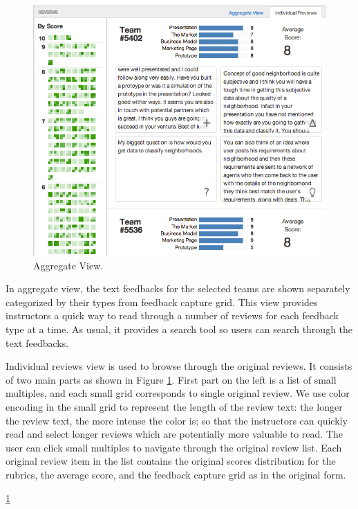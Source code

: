 \documentclass{sigchi}
\begin{document}
\begin{figure}[h]
\centering
\includegraphics[width=\columnwidth]{images/ind-review-view}
\caption{Aggregate View.}
\label{fig:ind-view}
\end{figure}


In aggregate view, the text feedbacks for the selected teams are shown separately categorized by their types from feedback capture grid.
This view provides instructors a quick way to read through a number of reviews
for each feedback type at a time. As usual, it provides a search tool so
users can search through the text feedbacks.

Individual reviews view is used to browse through the original reviews. It
consists of two main parts as shown in Figure \ref{fig:ind-view}. First part on the left is a list of small
multiples, and each small grid corresponds to single original review. We use color encoding in the small
grid to represent the length of the review text: the longer
the review text, the more intense the color is; so that the instructors can quickly read and select longer
reviews which are potentially more valuable to read. The user can click small
multiples to navigate through the original review list. Each original review item in the list contains the original scores distribution for the rubrics, the average score, and the feedback capture grid as in the
original form.




\ref{fig:ind-view}
\end{document}
